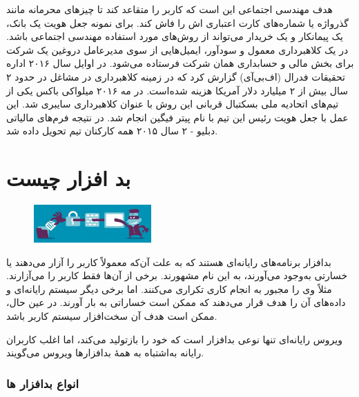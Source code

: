 \documentclass[12pt]{book}
\begin{document}
هدف مهندسی اجتماعی این است که کاربر را متقاعد کند تا چیزهای محرمانه مانند گذرواژه یا شماره‌های کارت اعتباری اش را فاش کند. برای نمونه جعل هویت یک بانک، یک پیمانکار و یک خریدار می‌تواند از روش‌های مورد استفاده مهندسی اجتماعی باشد. در یک کلاهبرداری معمول و سودآور، ایمیل‌هایی از سوی مدیرعامل دروغین یک شرکت برای بخش مالی و حسابداری همان شرکت فرستاده می‌شود. در اوایل سال ۲۰۱۶ اداره تحقیقات فدرال (اف‌بی‌آی) گزارش کرد که در زمینه کلاهبرداری در مشاغل در حدود ۲ سال بیش از ۲ میلیارد دلار آمریکا هزینه شده‌است. در مه ۲۰۱۶ میلواکی باکس یکی از تیم‌های اتحادیه ملی بسکتبال قربانی این روش با عنوان کلاهبرداری سایبری شد. این عمل با جعل هویت رئیس این تیم با نام پیتر فیگین انجام شد. در نتیجه فرم‌های مالیاتی دبلیو - ۲ سال ۲۰۱۵ همه کارکنان تیم تحویل داده شد.


\section{بد افزار چیست}


\begin{figure}
  \vspace{-20pt}
  \begin{center}
    \includegraphics[width=0.4\textwidth]{./hacker-getting-your-tablet-1024x470.jpg}
  \end{center}
  \vspace{-20pt}
  \caption{}
  \vspace{-10pt}
\end{figure}


بدافزار 
 برنامه‌های رایانه‌ای هستند که به علت آن‌که معمولاً کاربر را آزار می‌دهند یا خسارتی به‌وجود می‌آورند، به این نام مشهورند. برخی از آن‌ها فقط کاربر را می‌آزارند. مثلاً وی را مجبور به انجام کاری تکراری می‌کنند. اما برخی دیگر سیستم رایانه‌ای و داده‌های آن را هدف قرار می‌دهند که ممکن است خساراتی به بار آورند. در عین حال، ممکن است هدف آن سخت‌افزار سیستم کاربر باشد.

ویروس رایانه‌ای تنها نوعی بدافزار است که خود را بازتولید می‌کند، اما اغلب کاربران رایانه به‌اشتباه به همهٔ بدافزارها ویروس می‌گویند.


\subsubsection{انواع بدافزار ها}
\end{document}
